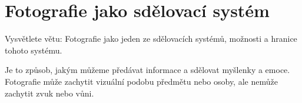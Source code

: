 \section{Fotografie jako sdělovací systém}
Vysvětlete větu: Fotografie jako jeden ze sdělovacích systémů, možnosti a hranice tohoto systému.

Je to způsob, jakým můžeme předávat informace a sdělovat myšlenky a emoce. Fotografie může zachytit vizuální podobu 
předmětu nebo osoby, ale nemůže zachytit zvuk nebo vůni.